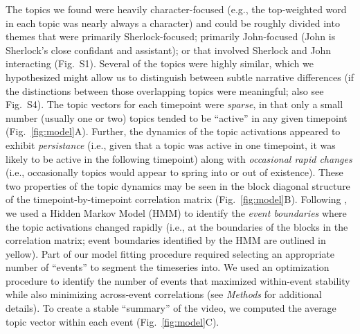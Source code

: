 \documentclass{article}
\newcommand{\topics}{S1}
\newcommand{\featureimportance}{S4}
\begin{document}
The topics we found were heavily character-focused (e.g., the top-weighted word in each topic was nearly always a character) and could be roughly divided into themes that were primarily Sherlock-focused; primarily John-focused (John is Sherlock's close confidant and assistant); or that involved Sherlock and John interacting (Fig.~\topics).  Several of the topics were highly similar, which we hypothesized might allow us to distinguish between subtle narrative differences (if the distinctions between those overlapping topics were meaningful; also see Fig.~\featureimportance).  The topic vectors for each timepoint were \textit{sparse}, in that only a small number (usually one or two) topics tended to be ``active'' in any given timepoint (Fig.~\ref{fig:model}A).  Further, the dynamics of the topic activations appeared to exhibit \textit{persistance} (i.e., given that a topic was active in one timepoint, it was likely to be active in the following timepoint) along with \textit{occasional rapid changes} (i.e., occasionally topics would appear to spring into or out of existence).  These two properties of the topic dynamics may be seen in the block diagonal structure of the timepoint-by-timepoint correlation matrix (Fig.~\ref{fig:model}B).  Following \cite{BaldEtal17}, we used a Hidden Markov Model (HMM) to identify the \textit{event boundaries} where the topic activations changed rapidly (i.e., at the boundaries of the blocks in the correlation matrix; event boundaries identified by the HMM are outlined in yellow).  Part of our model fitting procedure required selecting an appropriate number of ``events'' to segment the timeseries into.  We used an optimization procedure to identify the number of events that maximized within-event stability while also minimizing across-event correlations (see \textit{Methods} for additional details).  To create a stable ``summary'' of the video, we computed the average topic vector within each event (Fig.~\ref{fig:model}C).
\end{document}
